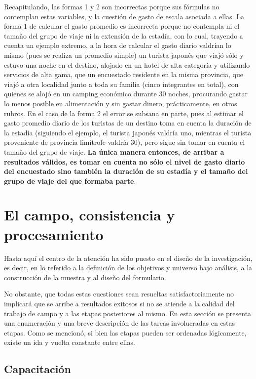 \documentclass[
]{book}
\begin{document}
Recapitulando, las formas 1 y 2 son incorrectas porque sus fórmulas no contemplan estas variables, y la cuestión de gasto de escala asociada a ellas. La forma 1 de calcular el gasto promedio es incorrecta porque no contempla ni el tamaño del grupo de viaje ni la extensión de la estadía, con lo cual, trayendo a cuenta un ejemplo extremo, a la hora de calcular el gasto diario valdrían lo mismo (pues se realiza un promedio simple) un turista japonés que viajó sólo y estuvo una noche en el destino, alojado en un hotel de alta categoría y utilizando servicios de alta gama, que un encuestado residente en la misma provincia, que viajó a otra localidad junto a toda su familia (cinco integrantes en total), con quienes se alojó en un camping económico durante 30 noches, procurando gastar lo menos posible en alimentación y sin gastar dinero, prácticamente, en otros rubros. En el caso de la forma 2 el error se subsana en parte, pues al estimar el gasto promedio diario de los turistas de un destino toma en cuenta la duración de la estadía (siguiendo el ejemplo, el turista japonés valdría uno, mientras el turista proveniente de provincia limítrofe valdría 30), pero sigue sin tomar en cuenta el tamaño del grupo de viaje. \textbf{La única manera entonces, de arribar a resultados válidos, es tomar en cuenta no sólo el nivel de gasto diario del encuestado sino también la duración de su estadía y el tamaño del grupo de viaje del que formaba parte}.

\hypertarget{el-campo-consistencia-y-procesamiento}{%
\section{El campo, consistencia y procesamiento}\label{el-campo-consistencia-y-procesamiento}}

Hasta aquí el centro de la atención ha sido puesto en el diseño de la investigación, es decir, en lo referido a la definición de los objetivos y universo bajo análisis, a la construcción de la muestra y al diseño del formulario.

No obstante, que todas estas cuestiones sean resueltas satisfactoriamente no implicará que se arribe a resultados exitosos si no se atiende a la calidad del trabajo de campo y a las etapas posteriores al mismo. En esta sección se presenta una enumeración y una breve descripción de las tareas involucradas en estas etapas. Como se mencionó, si bien las etapas pueden ser ordenadas lógicamente, existe un ida y vuelta constante entre ellas.

\hypertarget{capacitaciuxf3n}{%
\subsection{Capacitación}\label{capacitaciuxf3n}}
\end{document}
